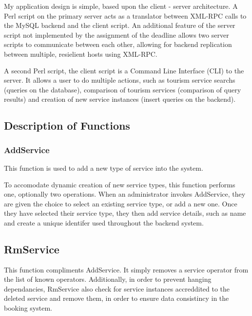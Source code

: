 \documentclass[a4paper,12pt]{article}
\begin{document}
My application design is simple, based upon the client - server
architecture. A Perl script on the primary server acts as a translator
between XML-RPC calls to the MySQL backend and the client script. An 
additional feature of the server script not implemented by the 
assignment of the deadline allows two server scripts to communicate
between each other, allowing for backend replication between multiple,
resielient hosts using XML-RPC.


A second Perl script, the client script is a Command Line Interface 
(CLI) to the server. It allows a user to do multiple actions, such as
tourism service searchs (queries on the database), comparison of tourism 
services (comparison of query results) and creation of new service
instances (insert queries on the backend).

\subsection{Description of Functions}


\subsubsection{AddService}

This function is used to add a new type of service into the system. 

To accomodate dynamic creation of new service types, this function
performs one, optionally two operations. When an administrator invokes 
AddService, they are given the choice to select an existing service 
type, or add a new one. Once they have selected their service type, they
then add service details, such as name and create a unique identifer
used throughout the backend system.


\subsection{RmService}

This function compliments AddService. It simply removes a service
operator from the list of known operators. Additionally, in order to
prevent hanging dependancies, RmService also check for service instances
accreddited to the deleted service and remove them, in order to ensure
data consistincy in the booking system.

\end{document}
